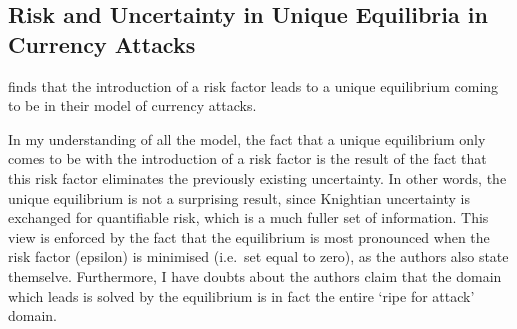 \documentclass[a4paper]{report}\usepackage{graphicx, color}
\begin{document}
\begin{refsection}

\chapter{Risk and Uncertainty in Unique Equilibria in Currency Attacks}
\label{currency}
\textcite{morris1998unique} finds that the introduction of a risk factor leads to a unique equilibrium coming to be in their model of currency attacks.

In my understanding of all the model, the fact that a unique equilibrium only comes to be with the introduction of a risk factor is the result of the fact that this risk factor eliminates the previously existing uncertainty. In other words, the unique equilibrium is not a surprising result, since Knightian uncertainty is exchanged for quantifiable risk, which is a much fuller set of information. This view is enforced by the fact that the equilibrium is most pronounced when the risk factor (epsilon) is minimised (i.e.~set equal to zero), as the authors also state themselve. Furthermore, I have doubts about the authors claim that the domain which leads is solved by the equilibrium is in fact the entire `ripe for attack' domain.

\nocite{taleb2010black}
\printbibliography
\end{refsection}
\end{document}
